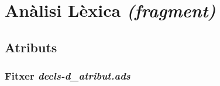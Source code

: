 \section{Anàlisi Lèxica {\it (fragment)}}

%

%

%

\subsection{Atributs}
\subsubsection{Fitxer \emph{decls-d\_atribut.ads}}

\newpage

%
